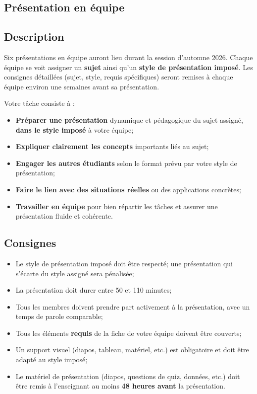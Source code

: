 \documentclass[11pt,french]{article}
\begin{document}
\begin{center}
    \section*{Présentation en équipe}

\end{center}

\subsection*{Description}
Six présentations en équipe auront lieu durant la session d'automne 2026. Chaque équipe se voit assigner un \textbf{sujet} ainsi qu'un \textbf{style de présentation imposé}. Les consignes détaillées (sujet, style, requis spécifiques) seront remises à chaque équipe environ une semaines avant sa présentation.


Votre tâche consiste à :
\begin{itemize}
    \item \textbf{Préparer une présentation} dynamique et pédagogique du sujet assigné, \textbf{dans le style imposé} à votre équipe;
    \item \textbf{Expliquer clairement les concepts} importants liés au sujet;
    \item \textbf{Engager les autres étudiants} selon le format prévu par votre style de présentation;
    \item \textbf{Faire le lien avec des situations réelles} ou des applications concrètes;
    \item \textbf{Travailler en équipe} pour bien répartir les tâches et assurer une présentation fluide et cohérente.
\end{itemize}

\subsection*{Consignes}

\begin{itemize}
    \item Le style de présentation imposé doit être respecté; une présentation qui s'écarte du style assigné sera pénalisée;
    \item La présentation doit durer entre 50 et 110 minutes;
    \item Tous les membres doivent prendre part activement à la présentation, avec un temps de parole comparable;
    \item Tous les éléments \textbf{requis} de la fiche de votre équipe doivent être couverts;
    \item Un support visuel (diapos, tableau, matériel, etc.) est obligatoire et doit être adapté au style imposé;
    \item Le matériel de présentation (diapos, questions de quiz, données, etc.) doit être remis à l'enseignant au moins \textbf{48 heures avant} la présentation.
\end{itemize}
\end{document}
